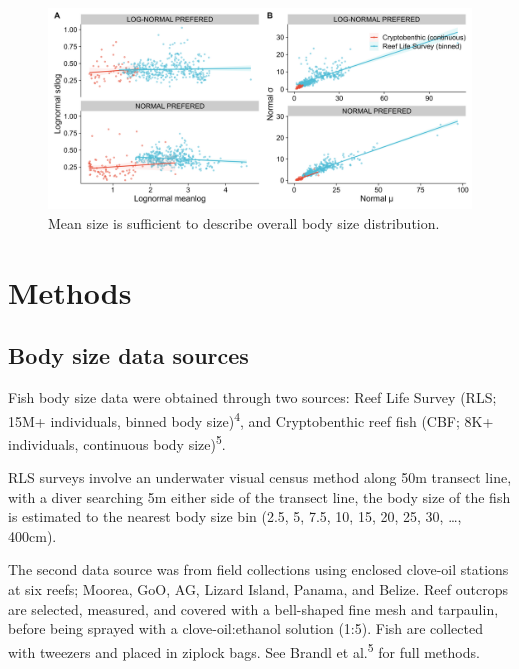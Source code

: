 \documentclass[
]{agujournal2019}
\begin{document}
\begin{figure}

{\centering \includegraphics{ms_figures/param_regression.png}

}

\caption{\label{fig-param-regression}Mean size is sufficient to describe
overall body size distribution.}

\end{figure}

\hypertarget{sec-methods}{%
\section{Methods}\label{sec-methods}}

\hypertarget{body-size-data-sources}{%
\subsection{Body size data sources}\label{body-size-data-sources}}

Fish body size data were obtained through two sources: Reef Life Survey
(RLS; 15M+ individuals, binned body size)\textsuperscript{4}, and
Cryptobenthic reef fish (CBF; 8K+ individuals, continuous body
size)\textsuperscript{5}.

RLS surveys involve an underwater visual census method along 50m
transect line, with a diver searching 5m either side of the transect
line, the body size of the fish is estimated to the nearest body size
bin (2.5, 5, 7.5, 10, 15, 20, 25, 30, \ldots, 400cm).

The second data source was from field collections using enclosed
clove-oil stations at six reefs; Moorea, GoO, AG, Lizard Island, Panama,
and Belize. Reef outcrops are selected, measured, and covered with a
bell-shaped fine mesh and tarpaulin, before being sprayed with a
clove-oil:ethanol solution (1:5). Fish are collected with tweezers and
placed in ziplock bags. See Brandl et al.\textsuperscript{5} for full
methods.
\end{document}
